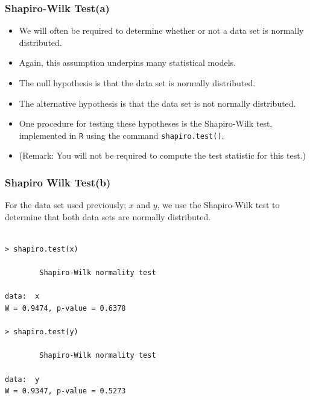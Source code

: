 \documentclass[a4]{beamer}
\begin{document}


\begin{frame}
\frametitle{Shapiro-Wilk Test(a)}


\begin{itemize}
\item We will often be required to determine whether or not a data set is normally distributed.
\item Again, this assumption underpins many statistical models.
\item The null hypothesis is that the data set is normally distributed.
\item The alternative hypothesis is that the data set is not normally distributed.
\item One procedure for testing these hypotheses is the Shapiro-Wilk test, implemented in \texttt{R} using the command \texttt{shapiro.test()}.
\item (Remark: You will not be required to compute the test statistic for this test.)
\end{itemize}
\end{frame}
\begin{frame}[fragile]
\frametitle{Shapiro Wilk Test(b)}
For the data set used previously; $x$ and $y$, we use the Shapiro-Wilk test to determine that both data sets are normally distributed.
\begin{verbatim}

> shapiro.test(x)

        Shapiro-Wilk normality test

data:  x
W = 0.9474, p-value = 0.6378

> shapiro.test(y)

        Shapiro-Wilk normality test

data:  y
W = 0.9347, p-value = 0.5273
\end{verbatim}

\end{frame}
\end{document}
